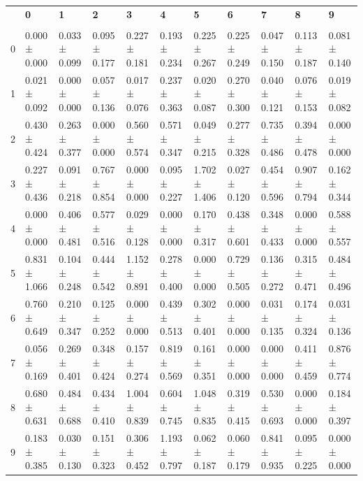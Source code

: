 \begingroup
\scriptsize
\setlength{\tabcolsep}{3pt}
\begin{tabular}{lllllllllll}
\toprule
 & \textbf{0} & \textbf{1} & \textbf{2} & \textbf{3} & \textbf{4} & \textbf{5} & \textbf{6} & \textbf{7} & \textbf{8} & \textbf{9} \\
  &  &  &  &  &  &  &  &  &  &  \\
\midrule
0 & 0.000 ± 0.000 & 0.033 ± 0.099 & 0.095 ± 0.177 & 0.227 ± 0.181 & 0.193 ± 0.234 & 0.225 ± 0.267 & 0.225 ± 0.249 & 0.047 ± 0.150 & 0.113 ± 0.187 & 0.081 ± 0.140 \\
1 & 0.021 ± 0.092 & 0.000 ± 0.000 & 0.057 ± 0.136 & 0.017 ± 0.076 & 0.237 ± 0.363 & 0.020 ± 0.087 & 0.270 ± 0.300 & 0.040 ± 0.121 & 0.076 ± 0.153 & 0.019 ± 0.082 \\
2 & 0.430 ± 0.424 & 0.263 ± 0.377 & 0.000 ± 0.000 & 0.560 ± 0.574 & 0.571 ± 0.347 & 0.049 ± 0.215 & 0.277 ± 0.328 & 0.735 ± 0.486 & 0.394 ± 0.478 & 0.000 ± 0.000 \\
3 & 0.227 ± 0.436 & 0.091 ± 0.218 & 0.767 ± 0.854 & 0.000 ± 0.000 & 0.095 ± 0.227 & 1.702 ± 1.406 & 0.027 ± 0.120 & 0.454 ± 0.596 & 0.907 ± 0.794 & 0.162 ± 0.344 \\
4 & 0.000 ± 0.000 & 0.406 ± 0.481 & 0.577 ± 0.516 & 0.029 ± 0.128 & 0.000 ± 0.000 & 0.170 ± 0.317 & 0.438 ± 0.601 & 0.348 ± 0.433 & 0.000 ± 0.000 & 0.588 ± 0.557 \\
5 & 0.831 ± 1.066 & 0.104 ± 0.248 & 0.444 ± 0.542 & 1.152 ± 0.891 & 0.278 ± 0.400 & 0.000 ± 0.000 & 0.729 ± 0.505 & 0.136 ± 0.272 & 0.315 ± 0.471 & 0.484 ± 0.496 \\
6 & 0.760 ± 0.649 & 0.210 ± 0.347 & 0.125 ± 0.252 & 0.000 ± 0.000 & 0.439 ± 0.513 & 0.302 ± 0.401 & 0.000 ± 0.000 & 0.031 ± 0.135 & 0.174 ± 0.324 & 0.031 ± 0.136 \\
7 & 0.056 ± 0.169 & 0.269 ± 0.401 & 0.348 ± 0.424 & 0.157 ± 0.274 & 0.819 ± 0.569 & 0.161 ± 0.351 & 0.000 ± 0.000 & 0.000 ± 0.000 & 0.411 ± 0.459 & 0.876 ± 0.774 \\
8 & 0.680 ± 0.631 & 0.484 ± 0.688 & 0.434 ± 0.410 & 1.004 ± 0.839 & 0.604 ± 0.745 & 1.048 ± 0.835 & 0.319 ± 0.415 & 0.530 ± 0.693 & 0.000 ± 0.000 & 0.184 ± 0.397 \\
9 & 0.183 ± 0.385 & 0.030 ± 0.130 & 0.151 ± 0.323 & 0.306 ± 0.452 & 1.193 ± 0.797 & 0.062 ± 0.187 & 0.060 ± 0.179 & 0.841 ± 0.935 & 0.095 ± 0.225 & 0.000 ± 0.000 \\
\bottomrule
\end{tabular}

\endgroup
